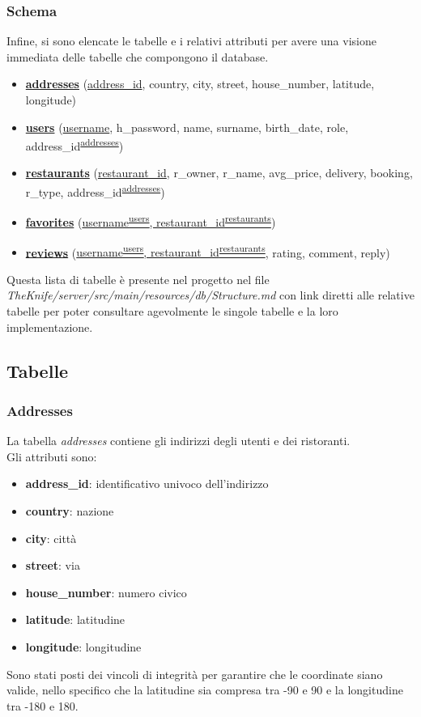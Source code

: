 \subsubsection{Schema}
Infine, si sono elencate le tabelle e i relativi attributi 
per avere una visione immediata delle tabelle che compongono il database.
\begin{itemize}
    \item \textbf{\hyperref[sec:addresses]{addresses}} (\underline{address\_id}, country, city, street, house\_number, latitude, longitude)
    \item \textbf{\hyperref[sec:users]{users}} (\underline{username}, h\_password, name, surname, birth\_date, role, address\_id\textsuperscript{\hyperref[sec:addresses]{addresses}})
    \item \textbf{\hyperref[sec:restaurants]{restaurants}} (\underline{restaurant\_id}, r\_owner, r\_name, avg\_price, delivery, booking, r\_type, address\_id\textsuperscript{\hyperref[sec:addresses]{addresses}})
    \item \textbf{\hyperref[sec:favorites]{favorites}} (\underline{username\textsuperscript{\hyperref[sec:users]{users}}, restaurant\_id\textsuperscript{\hyperref[sec:restaurants]{restaurants}}})
    \item \textbf{\hyperref[sec:reviews]{reviews}} (\underline{username\textsuperscript{\hyperref[sec:users]{users}}, restaurant\_id\textsuperscript{\hyperref[sec:restaurants]{restaurants}}}, rating, comment, reply)
\end{itemize}
Questa lista di tabelle è presente nel progetto nel file 
\textit{TheKnife/server/src/main/resources/db/Structure.md} 
con link diretti alle relative tabelle per poter consultare 
agevolmente le singole tabelle e la loro implementazione.

\subsection{Tabelle}
\subsubsection{Addresses}
\label{sec:addresses}
La tabella \textit{addresses} contiene gli indirizzi degli 
utenti e dei ristoranti.\\
Gli attributi sono:
\begin{itemize}
    \item \textbf{address\_id}: identificativo univoco dell'indirizzo
    \item \textbf{country}: nazione
    \item \textbf{city}: città
    \item \textbf{street}: via
    \item \textbf{house\_number}: numero civico
    \item \textbf{latitude}: latitudine
    \item \textbf{longitude}: longitudine
\end{itemize}
Sono stati posti dei vincoli di integrità per garantire che 
le coordinate siano valide, nello specifico che la latitudine
sia compresa tra -90 e 90 e la longitudine tra -180 e 180.

